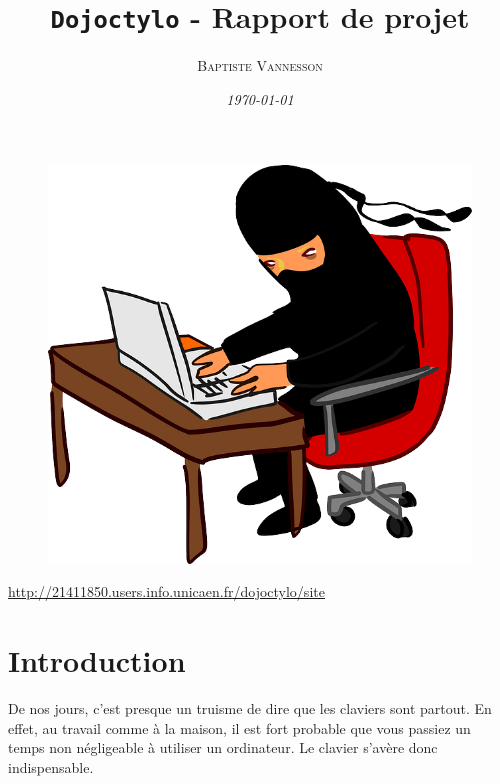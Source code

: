 \documentclass[a4paper,12pt]{article}
\title{\textbf{\texttt{Dojoctylo}} - Rapport de projet}
\author{\textsc{Baptiste Vannesson}}
\date{\textit{\today}}
\begin{document}
\maketitle
\begin{figure}[!h]
\begin{center}
\includegraphics[scale=0.3]{taipingu-clavier.png}
\end{center}
\end{figure}

\begin{center}
  \url{http://21411850.users.info.unicaen.fr/dojoctylo/site}
\end{center}

\newpage
\tableofcontents
\newpage
\listoffigures
\newpage



\part*{Introduction}

De nos jours, c'est presque un truisme de dire que les claviers sont partout. En effet, au travail comme à la maison, il est fort probable que vous passiez un temps non négligeable à utiliser un ordinateur. Le clavier s'avère donc indispensable.
\end{document}
